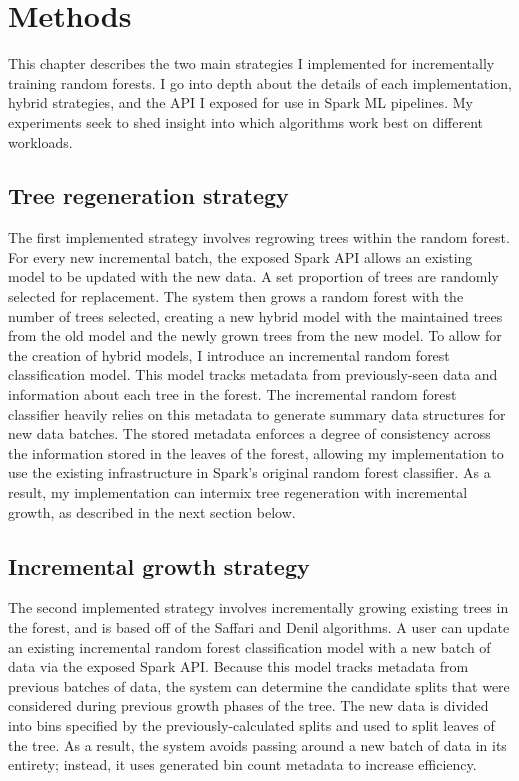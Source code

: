 \chapter{Methods} This chapter describes the two main strategies I implemented
for incrementally training random forests. I go into depth about the details of
each implementation, hybrid strategies, and the API I exposed for use in Spark
ML pipelines. My experiments seek to shed insight into which algorithms work
best on different workloads.

\section{Tree regeneration strategy}

The first implemented strategy involves regrowing trees within the random
forest. For every new incremental batch, the exposed Spark API allows an
existing model to be updated with the new data. A set proportion of trees are
randomly selected for replacement. The system then grows a random forest with
the number of trees selected, creating a new hybrid model with the
maintained trees from the old model and the newly grown trees from the new
model. To allow for the creation of hybrid models, I introduce an incremental
random forest classification model. This model tracks metadata from
previously-seen data and information about each tree in the forest. The
incremental random forest classifier heavily relies on this metadata to
generate summary data structures for new data batches. The stored metadata
enforces a degree of consistency across the information stored in the leaves of
the forest, allowing my implementation to use the existing infrastructure in
Spark's original random forest classifier. As a result, my implementation can
intermix tree regeneration with incremental growth, as described in the next
section below.

\section{Incremental growth strategy}

The second implemented strategy involves incrementally growing existing trees
in the forest, and is based off of the Saffari and Denil algorithms. A user can
update an existing incremental random forest classification model with a new
batch of data via the exposed Spark API. Because this model tracks metadata
from previous batches of data, the system can determine the candidate splits
that were considered during previous growth phases of the tree. The new data is
divided into bins specified by the previously-calculated splits and used to
split leaves of the tree. As a result, the system avoids passing around a new
batch of data in its entirety; instead, it uses generated bin count metadata to
increase efficiency.


